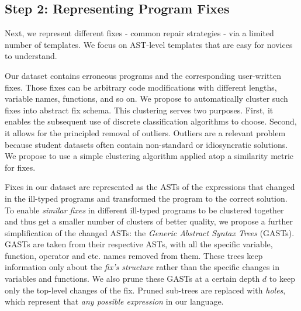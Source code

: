 \subsection{Step 2: Representing Program Fixes}
\label{subsec:step2}

Next, we represent different fixes - \ie common repair strategies - via a
limited number of templates. We focus on AST-level templates that are easy for
novices to understand.

 Our dataset contains erroneous programs and the
corresponding user-written fixes. Those fixes can be arbitrary code
modifications with different lengths, variable names, functions, and so on. We
propose to automatically cluster such fixes into abstract fix schema. This
clustering serves two purposes. First, it enables the subsequent use of discrete
classification algorithms to choose. Second, it allows for the principled
removal of outliers. Outliers are a relevant problem because student datasets
often contain non-standard or idiosyncratic solutions. We propose to use a
simple clustering algorithm applied atop a similarity metric for fixes.
%

Fixes in our dataset are represented as the ASTs of the expressions that changed
in the ill-typed programs and transformed the program to the correct solution.
To enable \emph{similar fixes} in different ill-typed programs to be clustered
together and thus get a smaller number of clusters of better quality, we propose
a further simplification of the changed ASTs: the \emph{Generic Abstract Syntax
Trees} (GASTs). GASTs are taken from their respective ASTs, with all the
specific variable, function, operator and etc. names removed from them. These
trees keep information only about the \emph{fix's structure} rather than the
specific changes in variables and functions. We also prune these GASTs at a
certain depth $d$ to keep only the top-level changes of the fix. Pruned
sub-trees are replaced with \emph{holes}, which represent that \emph{any
possible expression} in our language.


